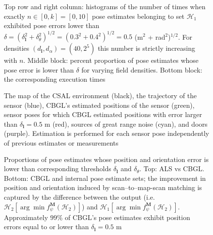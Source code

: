 \begin{figure}
  
  \caption{\small Top row and right column: histograms of the number of times
           when exactly $n \in [0,k] = [0,10]$ pose estimates belonging to set
           $\mathcal{H}_1$ exhibited pose errors lower than $\delta =
           (\delta_{\bm{l}}^2 + \delta_{\theta}^2)^{1/2} =  (0.3^2 +
           0.4^2)^{1/2} = 0.5$ (m$^2$ + rad$^2$)$^{1/2}$. For densities
           $(d_{\bm{l}},d_{\alpha}) = (40, 2^5)$ this number is strictly
           increasing with $n$. Middle block: percent proportion of pose
           estimates whose pose error is lower than $\delta$ for varying field
           densities. Bottom block: the corresponding execution times}
  \label{fig:a:determine_40_32}
\end{figure}


\begin{figure}
  
  \caption{\small The map of the CSAL environment (black), the trajectory of
           the sensor (blue), CBGL's estimated positions of the sensor (green),
           sensor poses for which CBGL estimated positions with error larger
           than $\delta_{\bm{l}} = 0.5$ m (red), sources of great range
           noise (cyan), and doors (purple). Estimation is performed for each
           sensor pose independently of previous estimates or measurements}
           \label{fig:a:map_and_trajectory}
\end{figure}

\begin{figure}
  
  \vspace{0.1cm}
  \caption{\small Proportions of pose estimates whose
           position and orientation error is lower than corresponding thresholds
           $\delta_{\bm{l}}$ and $\delta_{\theta}$. Top: ALS vs CBGL. Bottom:
           CBGL and internal pose estimate sets; the improvement in position
           and orientation induced by scan--to--map-scan matching is captured
           by the difference between the output (i.e.
           $\mathcal{H}_2[\arg \min f_{\psi}^{\bm{M}}(\mathcal{H}_2)]$) and
           $\mathcal{H}_1[\arg \min f_{\psi}^{\bm{M}}(\mathcal{H}_2)]$.
           Approximately $99\%$ of CBGL's pose estimates exhibit position
           errors equal to or lower than $\delta_{\bm{l}} = 0.5$ m}
  \label{fig:a:awesomeness}
\end{figure}


